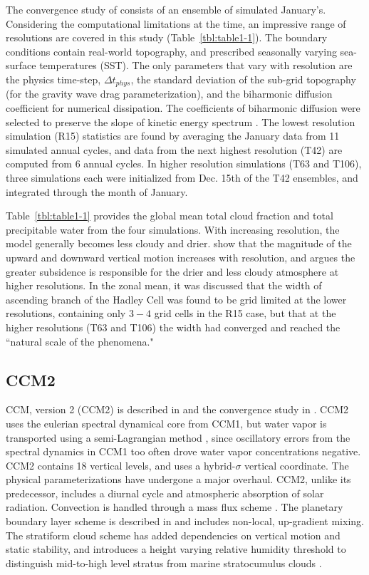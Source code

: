 The convergence study of \cite{KW1991JGR} consists of an ensemble of simulated January's. Considering the computational limitations at the time, an impressive range of resolutions are covered in this study (Table~\ref{tbl:table1-1}). The boundary conditions contain real-world topography, and prescribed seasonally varying sea-surface temperatures (SST). The only parameters that vary with resolution are the physics time-step, $\Delta t_{phys}$, the standard deviation of the sub-grid topography (for the gravity wave drag parameterization), and the biharmonic diffusion coefficient for numerical dissipation. The coefficients of biharmonic diffusion were selected to preserve the slope of kinetic energy spectrum \citep[see][]{B1991JCLIM}. The lowest resolution simulation (R15) statistics are found by averaging the January data from 11 simulated annual cycles, and data from the next highest resolution (T42) are computed from 6 annual cycles. In higher resolution simulations (T63 and T106), three simulations each were initialized from Dec. 15th of the T42 ensembles, and integrated through the month of January.

Table~\ref{tbl:table1-1} provides the global mean total cloud fraction and total precipitable water from the four simulations. With increasing resolution, the model generally becomes less cloudy and drier. \cite{KW1991JGR} show that the magnitude of the upward and downward vertical motion increases with resolution, and argues the greater subsidence is responsible for the drier and less cloudy atmosphere at higher resolutions. In the zonal mean, it was discussed that the width of ascending branch of the Hadley Cell was found to be grid limited at the lower resolutions, containing only $3-4$ grid cells in the R15 case, but that at the higher resolutions (T63 and T106) the width had converged and reached the ``natural scale of the phenomena."

\subsection{CCM2}

CCM, version 2 (CCM2) is described in \cite{CCM2} and the convergence study in \cite{WETAL1995CD}. CCM2 uses the eulerian spectral dynamical core from CCM1, but water vapor is transported using a semi-Lagrangian method \citep{WR1994TELLUS}, since oscillatory errors from the spectral dynamics in CCM1 too often drove water vapor concentrations negative. CCM2 contains 18 vertical levels, and uses a hybrid-$\sigma$ vertical coordinate. The physical parameterizations have undergone a major overhaul. CCM2, unlike its predecessor, includes a diurnal cycle and atmospheric absorption of solar radiation. Convection is handled through a mass flux scheme \citep{H1994JGR}. The planetary boundary layer scheme is described in \cite{HB1993JCLIM} and includes non-local, up-gradient mixing. The stratiform cloud scheme has added dependencies on vertical motion and static stability, and introduces a height varying relative humidity threshold to distinguish mid-to-high level stratus from marine stratocumulus clouds \citep{KETAL1994JGR}.

